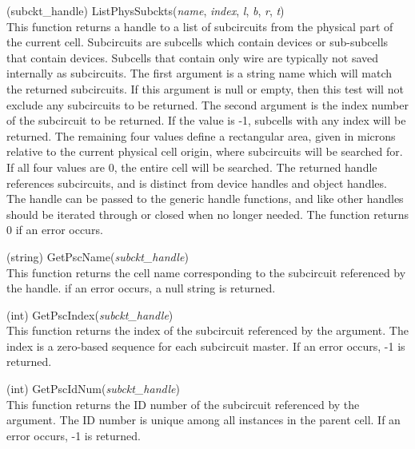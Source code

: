 \begin{description}
\item{(subckt\_handle) \vt ListPhysSubckts({\it name}, {\it index},
  {\it l}, {\it b}, {\it r}, {\it t\/})}\\
This function returns a handle to a list of subcircuits from the
physical part of the current cell.  Subcircuits are subcells which
contain devices or sub-subcells that contain devices.  Subcells that
contain only wire are typically not saved internally as subcircuits. 
The first argument is a string name which will match the returned
subcircuits.  If this argument is null or empty, then this test will
not exclude any subcircuits to be returned.  The second argument is
the index number of the subcircuit to be returned.  If the value is
-1, subcells with any index will be returned.  The remaining four
values define a rectangular area, given in microns relative to the
current physical cell origin, where subcircuits will be searched for. 
If all four values are 0, the entire cell will be searched.  The
returned handle references subcircuits, and is distinct from device
handles and object handles.  The handle can be passed to the generic
handle functions, and like other handles should be iterated through or
closed when no longer needed.  The function returns 0 if an error
occurs.

\item{(string) \vt GetPscName({\it subckt\_handle\/})}\\
This function returns the cell name corresponding to the subcircuit
referenced by the handle.  if an error occurs, a null string is
returned.

\item{(int) \vt GetPscIndex({\it subckt\_handle\/})}\\
This function returns the index of the subcircuit referenced by the
argument.  The index is a zero-based sequence for each subcircuit
master.  If an error occurs, -1 is returned.

\item{(int) \vt GetPscIdNum({\it subckt\_handle\/})}\\
This function returns the ID number of the subcircuit referenced by
the argument.  The ID number is unique among all instances in the
parent cell.  If an error occurs, -1 is returned.


\end{description}
